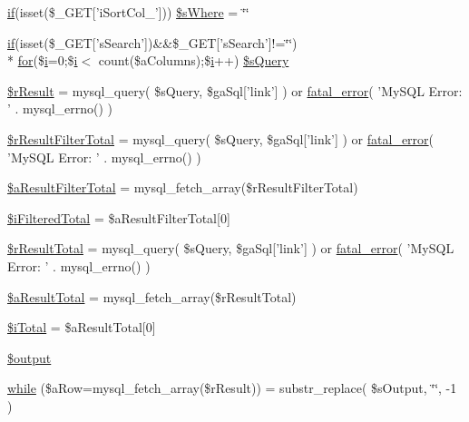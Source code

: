 \begin{DoxyCompactItemize}
\hyperlink{fullpage_2plugin_8js_a8b98017e64ef036adb9ae327ff94abe1}{if}(isset(\$\+\_\+\+G\+E\+T\mbox{[}'i\+Sort\+Col\+\_'\mbox{]})) \hyperlink{custom__data__property_8php_a377c76acb9c99eb7153f952d3e677c2b}{\$s\+Where} = \char`\"{}\char`\"{}
\item 
\hyperlink{fullpage_2plugin_8js_a8b98017e64ef036adb9ae327ff94abe1}{if}(isset(\$\+\_\+\+G\+E\+T\mbox{[}'s\+Search'\mbox{]})\&\&\$\+\_\+\+G\+E\+T\mbox{[}'s\+Search'\mbox{]}!=\char`\"{}\char`\"{}) \\*
\hyperlink{tinymce_8jquery_8dev_8js_a4675a875b20881bc5f7011f49fbd4da7}{for}(\$\hyperlink{validate_8js_a5e25b1d1bed9ab5f3174b76d6a722180}{i}=0;\$\hyperlink{validate_8js_a5e25b1d1bed9ab5f3174b76d6a722180}{i}$<$ count(\$a\+Columns);\$\hyperlink{validate_8js_a5e25b1d1bed9ab5f3174b76d6a722180}{i}++) \hyperlink{custom__data__property_8php_a5175d5486118502db3f7aa1ccf7029cc}{\$s\+Query}
\item 
\hyperlink{custom__data__property_8php_a8f423fcb1764890d70da997a4140f703}{\$r\+Result} = mysql\+\_\+query( \$s\+Query, \$ga\+Sql\mbox{[}'link'\mbox{]} ) or \hyperlink{examples_2server__side_2scripts_2server__processing_8php_a1bb235f2e57f0389e14b11592d32119a}{fatal\+\_\+error}( 'My\+S\+Q\+L Error\+: ' . mysql\+\_\+errno() )
\item 
\hyperlink{custom__data__property_8php_a29b3b8a9782e4c5b8157be2ba70a33e1}{\$r\+Result\+Filter\+Total} = mysql\+\_\+query( \$s\+Query, \$ga\+Sql\mbox{[}'link'\mbox{]} ) or \hyperlink{examples_2server__side_2scripts_2server__processing_8php_a1bb235f2e57f0389e14b11592d32119a}{fatal\+\_\+error}( 'My\+S\+Q\+L Error\+: ' . mysql\+\_\+errno() )
\item 
\hyperlink{custom__data__property_8php_a56c6da767ba5c9ca3c5f0c103dfaa77d}{\$a\+Result\+Filter\+Total} = mysql\+\_\+fetch\+\_\+array(\$r\+Result\+Filter\+Total)
\item 
\hyperlink{custom__data__property_8php_a48dbbdca4a5a8b8d03ef6c76dd65a5c1}{\$i\+Filtered\+Total} = \$a\+Result\+Filter\+Total\mbox{[}0\mbox{]}
\item 
\hyperlink{custom__data__property_8php_a48722b6bbefe9d4cb748bf0c3f936272}{\$r\+Result\+Total} = mysql\+\_\+query( \$s\+Query, \$ga\+Sql\mbox{[}'link'\mbox{]} ) or \hyperlink{examples_2server__side_2scripts_2server__processing_8php_a1bb235f2e57f0389e14b11592d32119a}{fatal\+\_\+error}( 'My\+S\+Q\+L Error\+: ' . mysql\+\_\+errno() )
\item 
\hyperlink{custom__data__property_8php_ab01fea9c7d5ce59f138eabb6206fe6b8}{\$a\+Result\+Total} = mysql\+\_\+fetch\+\_\+array(\$r\+Result\+Total)
\item 
\hyperlink{custom__data__property_8php_a7ba288b7060e9fe77272bafe66c2403d}{\$i\+Total} = \$a\+Result\+Total\mbox{[}0\mbox{]}
\item 
\hyperlink{custom__data__property_8php_a73004ce9cd673c1bfafd1dc351134797}{\$output}
\item 
\hyperlink{custom__data__property_8php_af99ef83a4601fbc42b287be8b03ba059}{while} (\$a\+Row=mysql\+\_\+fetch\+\_\+array(\$r\+Result)) = substr\+\_\+replace( \$s\+Output, \char`\"{}\char`\"{}, -\/1 )
\end{DoxyCompactItemize}



